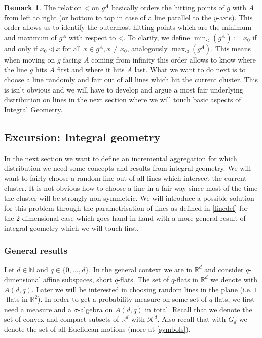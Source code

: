 \documentclass[12pt,a4paper]{scrartcl}
\newcommand{\R}{\mathbb{R}} %
\newcommand{\N}{\mathbb{N}} %
\newcommand{\K}{\mathcal{K}}
\newcommand{\1}{\mathbbm{1}}
\theoremstyle{definition}
\newtheorem{remark}{Remark}[subsection]
\numberwithin{equation}{section}
\begin{document}
\begin{remark}
	The relation $\triangleleft$ on $g^A$ basically orders the hitting points of $g$ with $A$ from left to right (or bottom to top in case of a line parallel to the $y$-axis). This order allows us to identify the outermost hitting points which are the minimum and maximum of $g^A$ with respect to $\triangleleft$. To clarify, we define $\min_\triangleleft (g^A) := x_0$ if and only if $x_0 \triangleleft x$ for all $x\in g^A,x\neq x_0$, analogously $\max_\triangleleft(g^A)$. This means when moving on $g$ facing $A$ coming from infinity this order allows to know where the line $g$ hits $A$ first and where it hits $A$ last. What we want to do next is to choose a line randomly and fair out of all lines which hit the current cluster. This is isn't obvious and we will have to develop and argue a most fair underlying distribution on lines in the next section where we will touch basic aspects of Integral Geometry. 
\end{remark}


\subsection{Excursion: Integral geometry}

In the next section we want to define an incremental aggregation for which distribution we need some concepts and results from integral geometry. We will want to fairly choose a random line out of all lines which intersect the current cluster. It is not obvious how to choose a line in a fair way since most of the time the cluster will be strongly non symmetric. We will introduce a possible solution for this problem through the parametrisation of lines as defined in \ref{linedef} for the $2$-dimensional case which goes hand in hand with a more general result of integral geometry which we will touch first.

\subsubsection{General results}

Let $d\in\N$ and $q\in \{0,\dots,d\}$. In the general context we are in $\R^d$ and consider $q$-dimensional affine subspaces, short $q$-flats. The set of $q$-flats in $\R^d$ we denote with $A(d,q)$. Later we will be interested in choosing random lines in the plane (i.e. $1$-flats in $\R^2$). In order to get a probability measure on some set of $q$-flats, we first need a measure and a $\sigma$-algebra on $A(d,q)$ in total. Recall that we denote the set of convex and compact subsets of $\R^d$ with $\K^d$. Also recall that with $G_d$ we denote the set of all Euclidean motions (more at \ref{symbols}).
\end{document}
